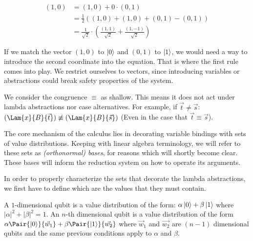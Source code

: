 \begin{align*}
  (1,0) &= (1,0) + 0 \cdot (0,1) \\
  &=\frac{1}{2} ((1,0) + (1,0) + (0,1) - (0,1))\\
  &=\frac{1}{\sqrt{2}}\cdot\left(\frac{(1,1)}{\sqrt{2}} + \frac{(1,-1)}{\sqrt{2}}\right)  
\end{align*}

If we match the vector $(1,0)$ to $\left\vert{0}\right\rangle$ and $(0,1)$ to $\left\vert{1}\right\rangle$, we would need a way to introduce the second coordinate into the equation. That is where the first rule comes into play. We restrict ourselves to vectors, since introducing variables or abstractions could break safety properties of the system.

We consider the congruence $\equiv$ as shallow. This means it does not act under lambda abstractions nor case alternatives. For example, if $\vec{t}\neq\vec{s}$: $(\Lam{x}{B}{\vec{t}}) \not\equiv (\Lam{x}{B}{\vec{s}})$ (Even in the case that $\vec{t}\equiv\vec{s}$).



The core mechanism of the calculus lies in decorating variable bindings with sets of value distributions. Keeping with linear algebra terminology, we will refer to these sets as \textit{(orthonormal) bases}, for reasons which will shortly become clear. These bases will inform the reduction system on how to operate its arguments. 

In order to properly characterize the sets that decorate the lambda abstractions, we first have to define which are the values that they must contain.
\begin{definition}
  A $1$-dimensional qubit is a value distribution of the form: $\alpha \left\vert{0}\right\rangle + \beta \left\vert{1}\right\rangle$ where $|\alpha|^2 + |\beta|^2 = 1$. An $n$-th dimensional qubit is a value distribution of the form $\alpha\Pair{\ket{0}}{\vec w_1} + \beta\Pair{\ket{1}}{\vec{w_2}} $ where $\vec w_1$ and $\vec{w_2}$ are $(n-1)$ dimensional qubits and the same previous conditions apply to $\alpha$ and $\beta$.
\end{definition}


